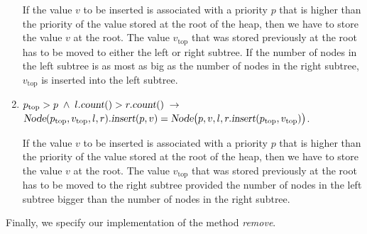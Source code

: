 \begin{enumerate}
      If the value $v$ to be inserted is associated with a priority $p$ that is higher than the priority of
      the value stored at the root of the heap, then we have to store the value $v$ at the root.
      The value $v_\mathrm{top}$ that was stored previously at the root has to be moved to either
      the left or right subtree.  If the number of nodes in the left subtree is as most as big as
      the number of nodes in the right subtree, $v_\mathrm{top}$ is inserted into the left subtree.
\item $p_{\mathrm{top}} > p \;\wedge\; l.\textsl{count}() > r.\textsl{count}() \;\rightarrow $ \\[0.1cm] 
      \hspace*{1.3cm} 
      $\textsl{Node}(p_{\mathrm{top}},v_\mathrm{top},l,r).\textsl{insert}(p,v) =
                 \textsl{Node}\bigl(p,v,l,r.\textsl{insert}(p_\mathrm{top},v_\mathrm{top})\bigr)$.

      If the value $v$ to be inserted is associated with a priority $p$ that is higher than the priority of
      the value stored at the root of the heap, then we have to store the value $v$ at the root.
      The value $v_\mathrm{top}$ that was stored previously at the root has to be moved to 
      the right subtree provided the number of nodes in the left subtree bigger than
      the number of nodes in the right subtree.
\end{enumerate}
Finally, we specify our implementation of the method \textsl{remove}.
